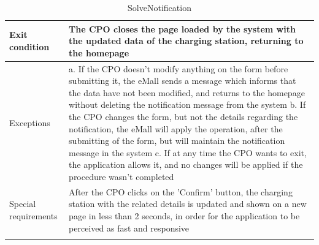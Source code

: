 \begin{center}
\begin{longtable}{p{4cm} p{11cm}}
     \hline
     Exit condition &  The CPO closes the page loaded by the system with the updated data of the charging station, returning to the homepage \\
     \hline
     Exceptions &   a. If the CPO doesn't modify anything on the form before submitting it, the eMall sends a                       message which informs that the data have not been modified, and returns to the homepage without                 deleting the notification message from the system \newline
                    b. If the CPO changes the form, but not the details regarding the notification, the eMall will apply the operation, after the submitting of the form, but will maintain the notification message in the system \newline 
                    c. If at any time the CPO wants to exit, the application allows it, and no changes will be applied if the procedure wasn't completed \\
     \hline
     Special requirements & After the CPO clicks on the 'Confirm' button, the charging station with the related details is updated and shown on a new page in less than 2 seconds, in order for the application to be perceived as fast and responsive \\
     \hline
    \caption{SolveNotification}
    \label{tab:SolveNotification}
    \end{longtable}
\end{center}
\clearpage